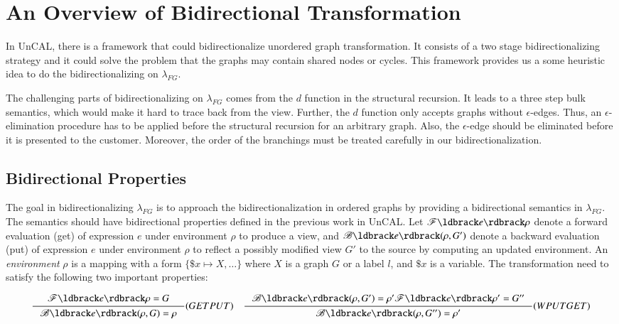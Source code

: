 \documentclass{llncs}
\begin{document}
\section{An Overview of Bidirectional Transformation}\label{sec-over}

In UnCAL, there is a framework that could bidirectionalize unordered graph transformation. It consists of a two stage bidirectionalizing strategy and it could solve the problem that the graphs may contain shared nodes or cycles. This framework provides us a some heuristic idea to do the bidirectionalizing on $\lambda_{FG}$. 

The challenging parts of bidirectionalizing on $\lambda_{FG}$ comes from the $d$ function in the structural recursion. It leads to a three step bulk semantics, which would make it hard to trace back from the view. Further, the $d$ function only accepts graphs without $\epsilon$-edges. Thus, an $\epsilon$-elimination procedure has to be applied before the structural recursion for an arbitrary graph. Also, the $\epsilon$-edge should be eliminated before it is presented to the customer. Moreover, the order of the branchings must be treated carefully in our bidirectionalization. 

\subsection{Bidirectional Properties}

The goal in bidirectionalizing $\lambda_{FG}$ is to approach the bidirectionalization in ordered graphs by providing a bidirectional semantics in $\lambda_{FG}$. The semantics should have bidirectional properties defined in the previous work in UnCAL. Let $\mathscr{F}\ldbrack e\rdbrack\rho$ denote a forward evaluation (get) of expression $e$ under environment $\rho$ to produce a view, and $\mathscr{B}\ldbrack e\rdbrack(\rho,G')$ denote a backward evaluation (put) of expression $e$ under environment $\rho$ to reflect a possibly modified view $G'$ to the source by computing an updated environment. An \emph{environment} $\rho$ is a mapping with a form $\{\$x\mapsto X,\ldots\}$ where $X$ is a graph $G$ or a label $l$, and $\$x$ is a variable. The transformation need to satisfy the following two important properties:

$$\inference{\mathscr{F}\ldbrack e\rdbrack\rho=G}{\mathscr{B}\ldbrack e\rdbrack(\rho,G)=\rho}(GETPUT)\quad
\inference{\mathscr{B}\ldbrack e\rdbrack(\rho,G')=\rho' \mathscr{F}\ldbrack e\rdbrack\rho'=G''}{\mathscr{B}\ldbrack e\rdbrack(\rho,G'')=\rho'}(WPUTGET)$$
\end{document}
